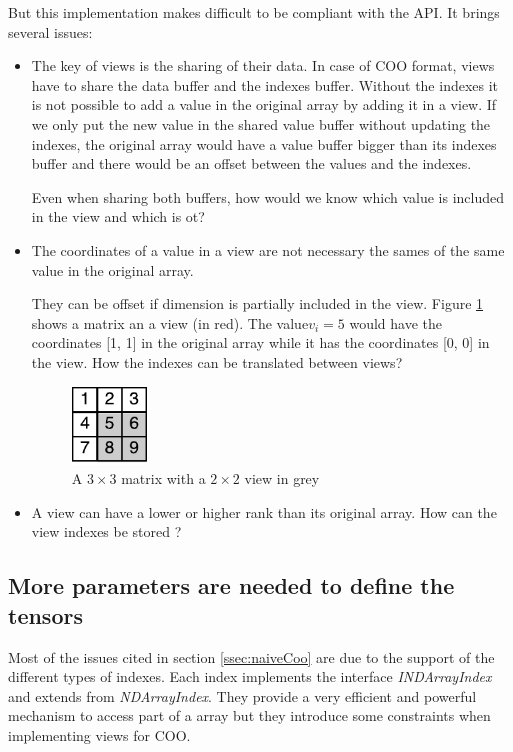 But this implementation makes difficult to be compliant with the API. It brings several issues:
\begin{itemize}
	\item The key of views is the sharing of their data. In case of COO format, views have to share the data buffer and the indexes buffer. Without the indexes it is not possible to add a value in the original array by adding it in a view. If we only put the new value in the shared value buffer without updating the indexes, the original array would have a value buffer bigger than its indexes buffer and there would be an offset between the values and the indexes. 
	
	Even when sharing both buffers, how would we know which value is included in the view and which is ot? 	
	
	\item The coordinates of a value in a view are not necessary the sames of the same value in the original array. 
		
	They can be offset if dimension is partially included in the view. Figure \ref{fig:viewOffset} shows a matrix an a view (in red). The value$ v_{i}=5$ would have the coordinates [1, 1] in the original array while it has the coordinates [0, 0] in the view. How the indexes can be translated between views?
	\begin{figure}[!h]
		\centering
		\includegraphics[width=0.8in]{images/viewIndexOffset.pdf}
		\caption{A $3\times 3$ matrix with a $2\times 2$ view in grey}
		\label{fig:viewOffset}
	\end{figure}

	\item A view can have a lower or higher rank than its original array. How can the view indexes be stored ?
\end{itemize}

\subsection{More parameters are needed to define the tensors}

Most of the issues cited in section \ref{ssec:naiveCoo} are due to the support of the different types of indexes. Each index implements the interface \textit{INDArrayIndex} and extends from \textit{NDArrayIndex}. They provide a very efficient and powerful mechanism to access part of a array but they introduce some constraints when implementing views for COO.

